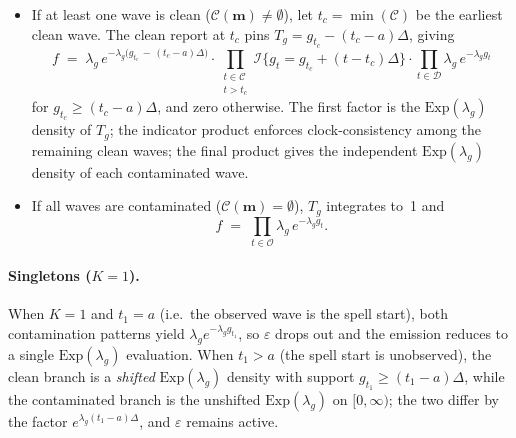 \documentclass[12pt]{article}
\begin{document}
\begin{itemize}
\item If at least one wave is clean
  (\(\mathcal{C}(\mathbf{m}) \neq \emptyset\)), let
  \(t_c = \min(\mathcal{C})\) be the earliest clean wave. The clean
  report at \(t_c\) pins \(T_g = g_{t_c} - (t_c - a)\Delta\), giving
  \begin{equation}
  f \;=\; \lambda_g\, e^{-\lambda_g\bigl(g_{t_c}\, -\, (t_c-a)\Delta\bigr)}
  \cdot \prod_{\substack{t \in \mathcal{C} \\[2pt] t > t_c}}
  \!\mathcal{I}\!\big\{g_t = g_{t_c} + (t - t_c)\Delta\big\}
  \cdot \prod_{t \in \mathcal{D}} \lambda_g\, e^{-\lambda_g g_t}
  \label{eq:per_pattern_density}
  \end{equation}
  for \(g_{t_c} \ge (t_c - a)\Delta\), and zero otherwise. The first
  factor is the \(\mathrm{Exp}(\lambda_g)\) density of \(T_g\); the
  indicator product enforces clock-consistency among the remaining
  clean waves; the final product gives the independent
  \(\mathrm{Exp}(\lambda_g)\) density of each contaminated wave.
\item If all waves are contaminated
  (\(\mathcal{C}(\mathbf{m}) = \emptyset\)), \(T_g\) integrates to~1 and
  \[
  f \;=\; \prod_{t \in \mathcal{O}} \lambda_g\, e^{-\lambda_g g_t}.
  \]
\end{itemize}

\paragraph{Singletons (\(K = 1\)).}
When \(K = 1\) and \(t_1 = a\) (i.e.\ the observed wave is the spell
start), both contamination patterns yield
\(\lambda_g e^{-\lambda_g g_{t_1}}\), so \(\varepsilon\) drops out and the
emission reduces to a single \(\mathrm{Exp}(\lambda_g)\) evaluation.
When \(t_1 > a\) (the spell start is unobserved), the clean branch is
a \emph{shifted} \(\mathrm{Exp}(\lambda_g)\) density with support
\(g_{t_1} \ge (t_1-a)\Delta\), while the contaminated branch is the
unshifted \(\mathrm{Exp}(\lambda_g)\) on \([0,\infty)\); the two differ
by the factor \(e^{\lambda_g (t_1-a)\Delta}\), and \(\varepsilon\)
remains active.
\end{document}
